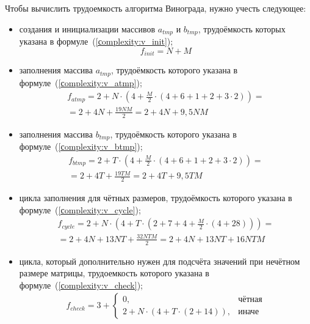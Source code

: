 Чтобы вычислить трудоемкость алгоритма Винограда, нужно учесть следующее:
\begin{itemize}[label=---]
	\item создания и инициализации массивов $a_{tmp}$ и $b_{tmp}$, трудоёмкость которых указана в формуле~(\ref{сomplexity:v_init});
	\begin{equation}
		\label{сomplexity:v_init}
		f_{init} = N + M
	\end{equation}
	\item заполнения массива $a_{tmp}$, трудоёмкость которого указана в формуле~(\ref{сomplexity:v_atmp});
	\begin{equation}
		\label{сomplexity:v_atmp}
		\begin{gathered}
			f_{atmp} = 2 + N \cdot (4 + \frac{M}{2} \cdot (4 + 6 + 1 + 2 + 3 \cdot 2)) = \\
			= 2 + 4N + \frac{19NM}{2} = 2 + 4N + 9,5NM
		\end{gathered} 
	\end{equation}
	\item заполнения массива $b_{tmp}$, трудоёмкость которого указана в формуле~(\ref{сomplexity:v_btmp});
	\begin{equation}
		\label{сomplexity:v_btmp}
		\begin{gathered}
			f_{btmp} = 2 + T \cdot (4 + \frac{M}{2} \cdot (4 + 6 + 1 + 2 + 3 \cdot 2)) = \\
			= 2 + 4T + \frac{19TM}{2} = 2 + 4T + 9,5TM
		\end{gathered}  
	\end{equation}
	\item цикла заполнения для чётных размеров, трудоёмкость которого указана в формуле~(\ref{сomplexity:v_cycle});
	\begin{equation}
		\label{сomplexity:v_cycle}
		\begin{gathered}
			f_{cycle} = 2 + N \cdot (4 + T \cdot (2 + 7 + 4 + \frac{M}{2} \cdot (4 + 28))) = \\
			= 2 + 4N + 13NT + \frac{32NTM}{2}  = 2 + 4N + 13NT + 16NTM 
		\end{gathered}
	\end{equation}
	\item цикла, который дополнительно нужен для подсчёта значений при нечётном размере матрицы, трудоемкость которого указана в формуле~(\ref{сomplexity:v_check});
	\begin{equation}
		\label{сomplexity:v_check}
		\begin{gathered}
			f_{check} = 3 + 
			\begin{cases}
				0, & \text{чётная} \\
				2 + N \cdot (4 + T \cdot (2 + 14)), & \text{иначе}
			\end{cases}
		\end{gathered}  
	\end{equation}
\end{itemize}

